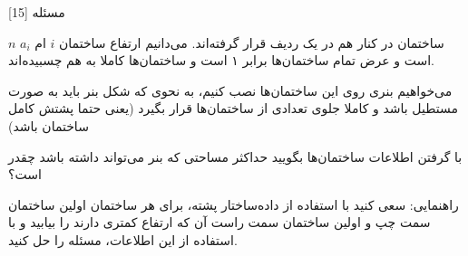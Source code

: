 ‌مسئله [15]

% 
%
%
% 

$n$
ساختمان در کنار هم در یک ردیف قرار گرفته‌اند.
می‌دانیم ارتفاع ساختمان 
$i$
ام 
$a_i$
است و عرض تمام ساختمان‌ها برابر ۱ است و ساختمان‌ها کاملا به هم چسبیده‌اند.

می‌خواهیم بنری روی این ساختمان‌ها نصب کنیم، به نحوی که شکل بنر باید به صورت مستطیل باشد و کاملا جلوی تعدادی از ساختمان‌ها قرار بگیرد (یعنی حتما پشتش کامل ساختمان باشد)

با گرفتن اطلاعات ساختمان‌ها بگویید حداکثر مساحتی که بنر می‌تواند داشته باشد چقدر است؟

راهنمایی: سعی کنید با استفاده از داده‌ساختار پشته، برای هر ساختمان اولین ساختمان سمت چپ و اولین ساختمان سمت راست آن که ارتفاع کمتری دارند را بیابید و با استفاده از این اطلاعات، مسئله را حل کنید.


